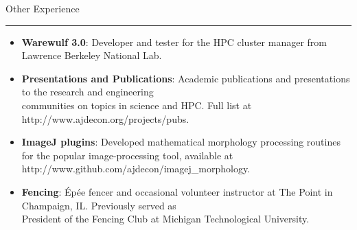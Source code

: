 \documentclass[12pt]{article}
\newcommand{\bigsection}[1]{	
	\vspace{4pt}
	{\fontfamily{phv}\selectfont\Large#1}

	\vspace{-10pt} \rule{\textwidth}{1pt}
}
\begin{document}


\vspace{16pt}


\bigsection{Other Experience}
\vspace{-15pt}
\begin{itemize}\setlength{\itemsep}{0cm}
  \setlength{\parskip}{0cm}
    \item \textbf{Warewulf 3.0}: Developer and tester for the HPC cluster manager from Lawrence Berkeley National Lab.
    \item \textbf{Presentations and Publications}: Academic publications and presentations to the research and engineering \\ 
    communities on topics in science and HPC. Full list at http://www.ajdecon.org/projects/pubs.
    \item \textbf{ImageJ plugins}: Developed mathematical morphology processing routines for the popular image-processing tool, available at http://www.github.com/ajdecon/imagej\_morphology.
    \item \textbf{Fencing}: \'{E}p\'{e}e fencer and occasional volunteer instructor at The Point in Champaign, IL. Previously served as  \\ President of the Fencing Club at Michigan Technological University.

\end{itemize}
\end{document}

